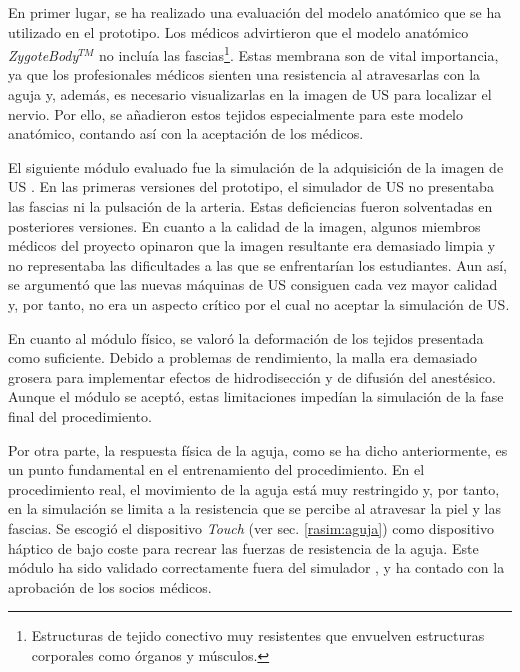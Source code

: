 En primer lugar, se ha realizado una evaluación del modelo anatómico que se ha utilizado en el prototipo. Los médicos advirtieron que el modelo anatómico \emph{ZygoteBody}$^{TM}$ no incluía las fascias\footnote{Estructuras de tejido conectivo muy resistentes que envuelven estructuras corporales como órganos y músculos.}. Estas membrana son de vital importancia, ya que los profesionales médicos sienten una resistencia al atravesarlas con la aguja y, además, es necesario visualizarlas en la imagen de \ac{US} para localizar el nervio. Por ello, se añadieron estos tejidos especialmente para este modelo anatómico, contando así con la aceptación de los médicos.

El siguiente módulo evaluado fue la simulación de la adquisición de la imagen de \ac{US} \cite{Law2015}. En las primeras versiones del prototipo, el simulador de \ac{US} no presentaba las fascias ni la pulsación de la arteria. Estas deficiencias fueron solventadas en posteriores versiones. En cuanto a la calidad de la imagen, algunos miembros médicos  del proyecto opinaron que la imagen resultante era demasiado limpia y no representaba las dificultades a las que se enfrentarían los estudiantes. Aun así, se argumentó que las nuevas máquinas de \ac{US} consiguen cada vez mayor calidad y, por tanto, no era un aspecto crítico por el cual no aceptar la simulación de \ac{US}.

En cuanto al módulo físico, se valoró la deformación de los tejidos presentada como suficiente. Debido a problemas de rendimiento, la malla era demasiado grosera para implementar efectos de hidrodisección y de difusión del anestésico. Aunque el módulo se aceptó, estas limitaciones impedían la simulación de la fase final del procedimiento.

Por otra parte, la respuesta física de la aguja, como se ha dicho anteriormente, es un punto fundamental en el entrenamiento del procedimiento. En el procedimiento real, el movimiento de la aguja está muy restringido y, por tanto, en la simulación se limita a la resistencia que se percibe al atravesar la piel y las fascias. Se escogió el dispositivo \emph{Touch} (ver sec. \ref{rasim:aguja}) como dispositivo háptico de bajo coste para recrear las fuerzas de resistencia de la aguja. Este módulo ha sido validado correctamente fuera del simulador \cite{needleinsertion}, y ha contado con la aprobación de los socios médicos.  %

